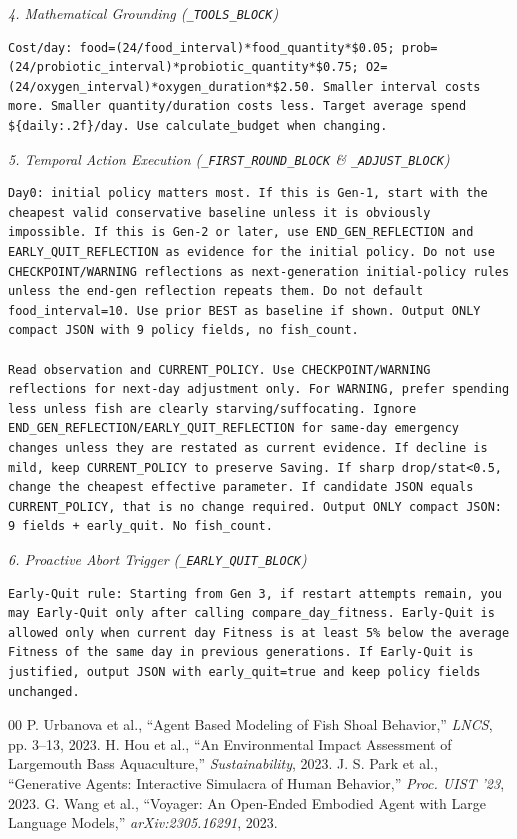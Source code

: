 \documentclass[conference]{IEEEtran}
\begin{document}
\textit{4. Mathematical Grounding (\texttt{\_TOOLS\_BLOCK})}
\begin{lstlisting}
Cost/day: food=(24/food_interval)*food_quantity*$0.05; prob=(24/probiotic_interval)*probiotic_quantity*$0.75; O2=(24/oxygen_interval)*oxygen_duration*$2.50. Smaller interval costs more. Smaller quantity/duration costs less. Target average spend ${daily:.2f}/day. Use calculate_budget when changing.
\end{lstlisting}

\textit{5. Temporal Action Execution (\texttt{\_FIRST\_ROUND\_BLOCK} \& \texttt{\_ADJUST\_BLOCK})}
\begin{lstlisting}
Day0: initial policy matters most. If this is Gen-1, start with the cheapest valid conservative baseline unless it is obviously impossible. If this is Gen-2 or later, use END_GEN_REFLECTION and EARLY_QUIT_REFLECTION as evidence for the initial policy. Do not use CHECKPOINT/WARNING reflections as next-generation initial-policy rules unless the end-gen reflection repeats them. Do not default food_interval=10. Use prior BEST as baseline if shown. Output ONLY compact JSON with 9 policy fields, no fish_count.

Read observation and CURRENT_POLICY. Use CHECKPOINT/WARNING reflections for next-day adjustment only. For WARNING, prefer spending less unless fish are clearly starving/suffocating. Ignore END_GEN_REFLECTION/EARLY_QUIT_REFLECTION for same-day emergency changes unless they are restated as current evidence. If decline is mild, keep CURRENT_POLICY to preserve Saving. If sharp drop/stat<0.5, change the cheapest effective parameter. If candidate JSON equals CURRENT_POLICY, that is no change required. Output ONLY compact JSON: 9 fields + early_quit. No fish_count.
\end{lstlisting}

\textit{6. Proactive Abort Trigger (\texttt{\_EARLY\_QUIT\_BLOCK})}
\begin{lstlisting}
Early-Quit rule: Starting from Gen 3, if restart attempts remain, you may Early-Quit only after calling compare_day_fitness. Early-Quit is allowed only when current day Fitness is at least 5% below the average Fitness of the same day in previous generations. If Early-Quit is justified, output JSON with early_quit=true and keep policy fields unchanged.
\end{lstlisting}

\begin{thebibliography}{00}
 P. Urbanova et al., ``Agent Based Modeling of Fish Shoal Behavior,'' \textit{LNCS}, pp. 3--13, 2023.
 H. Hou et al., ``An Environmental Impact Assessment of Largemouth Bass Aquaculture,'' \textit{Sustainability}, 2023.
 J. S. Park et al., ``Generative Agents: Interactive Simulacra of Human Behavior,'' \textit{Proc. UIST '23}, 2023.
 G. Wang et al., ``Voyager: An Open-Ended Embodied Agent with Large Language Models,'' \textit{arXiv:2305.16291}, 2023.
\end{thebibliography}
\end{document}
